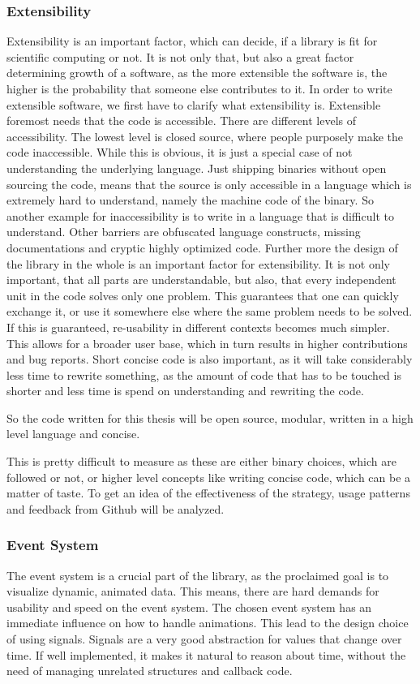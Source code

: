 \subsubsection{Extensibility}
Extensibility is an important factor, which can decide, if a library is fit for scientific computing or not. 
It is not only that, but also a great factor determining growth of a software, as the more extensible the software is, the higher is the probability that someone else contributes to it.
In order to write extensible software, we first have to clarify what extensibility is.
Extensible foremost needs that the code is accessible. There are different levels of accessibility. The lowest level is closed source, where people purposely make the code inaccessible. While this is obvious, it is just a special case of not understanding the underlying language. Just shipping binaries without open sourcing the code, means that the source is only accessible in a language which is extremely hard to understand, namely the machine code of the binary. So another example for inaccessibility is to write in a language that is difficult to understand. Other barriers are obfuscated language constructs, missing documentations and cryptic highly optimized code.
Further more the design of the library in the whole is an important factor for extensibility. It is not only important, that all parts are understandable, but also, that every independent unit in the code solves only one problem. This guarantees that one can quickly exchange it, or use it somewhere else where the same problem needs to be solved.
If this is guaranteed, re-usability in different contexts becomes much simpler. This allows for a broader user base, which in turn results in higher contributions and bug reports.
Short concise code is also important, as it will take considerably less time to rewrite something, as the amount of code that has to be touched is shorter and less time is spend on understanding and rewriting the code.

So the code written for this thesis will be open source, modular, written in a high level language and concise.

This is pretty difficult to measure as these are either binary choices, which are followed or not, 
or higher level concepts like writing concise code, which can be a matter of taste.
To get an idea of the effectiveness of the strategy, usage patterns and feedback from Github will be analyzed.

\subsubsection{Event System}
The event system is a crucial part of the library, as the proclaimed goal is to visualize dynamic, animated data.
This means, there are hard demands for usability and speed on the event system.
The chosen event system has an immediate influence on how to handle animations. 
This lead to the design choice of using signals. Signals are a very good abstraction for values that change over time.
If well implemented, it makes it natural to reason about time, without the need of managing unrelated structures and callback code.

